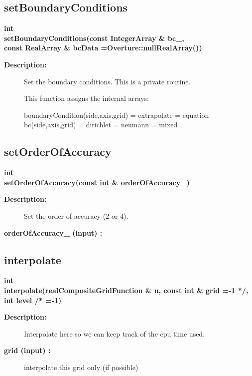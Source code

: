\subsection{setBoundaryConditions}
 
\begin{flushleft} \textbf{%
int  \\ 
\settowidth{\OgmgIncludeArgIndent}{setBoundaryConditions(}%
setBoundaryConditions(const IntegerArray \& bc\_,\\ 
const RealArray \& bcData  =Overture::nullRealArray())
}\end{flushleft}
\begin{description}
\item[{\bf Description:}] 
    Set the boundary conditions. This is a private routine.

 This function assigns the internal arrays:

   boundaryCondition(side,axis,grid) = extrapolate
                                     = equation
   bc(side,axis,grid) = dirichlet
                      = neumann
                      = mixed
 
\end{description}
\subsection{setOrderOfAccuracy}
 
\begin{flushleft} \textbf{%
int  \\ 
\settowidth{\OgmgIncludeArgIndent}{setOrderOfAccuracy(}%
setOrderOfAccuracy(const int \& orderOfAccuracy\_)
}\end{flushleft}
\begin{description}
\item[{\bf Description:}] 
    Set the order of accuracy (2 or 4).
\item[{\bf orderOfAccuracy\_ (input) :}]  

\end{description}
\subsection{interpolate}
 
\begin{flushleft} \textbf{%
int  \\ 
\settowidth{\OgmgIncludeArgIndent}{interpolate(}%
interpolate(realCompositeGridFunction \& u, const int \& grid  =-1 */, int level /* =-1)
}\end{flushleft}
\begin{description}
\item[{\bf Description:}] 

 Interpolate here so we can keep track of the cpu time used.

\item[{\bf grid (input) :}]  interpolate this grid only (if possible)
\end{description}
